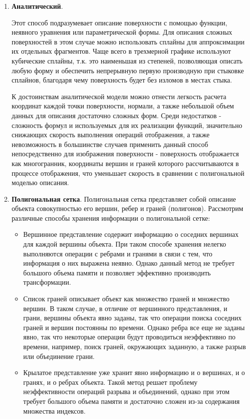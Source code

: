\begin{enumerate}
	\item \textbf{Аналитический}. 
	
	Этот способ подразумевает описание поверхности с помощью функции, неявного уравнения или параметрической формы. Для описания сложных поверхностей в этом случае можно использовать сплайны для аппроксимации их отдельных фрагментов. Чаще всего в трехмерной графике используют кубические сплайны, т.к. это наименьшая из степеней, позволяющая описать любую форму и обеспечить непрерывную первую производную при стыковке сплайнов, благодаря чему поверхность будет без изломов в местах стыка. 
	
	К достоинствам аналитической модели можно отнести легкость расчета координат каждой точки поверхности, нормали, а также небольшой объем данных для описания достаточно сложных форм. Среди недостатков - сложность формул и используемых для их реализации функций, значительно снижающих скорость выполнения операций отображения, а также невозможность в большинстве случаев применить данный способ непосредственно для изображения поверхности - поверхность отображается как многогранник, координаты вершин и граней которого рассчитываются в процессе отображения, что уменьшает скорость в сравнении с полигональной моделью описания.
	
	\item \textbf{Полигональная сетка}.
	Полигональная сетка представляет собой описание объекта совокупностью его вершин, ребер и граней (полигонов). Рассмотрим различные способы хранения информации о полигональной сетке:
	
	\begin{itemize}
		\item Вершинное представление содержит информацию о соседних вершинах для каждой вершины объекта. При таком способе хранения нелегко выполняются операции с ребрами и гранями в связи с тем, что информация о них выражена неявно. Однако данный метод не требует большого объема памяти и позволяет эффективно производить трансформации.
		\item Список граней описывает объект как множество граней и множество вершин. В таком случае, в отличие от вершинного представления, и грани, вершины объекта явно заданы, так что операции поиска соседних граней и вершин постоянны по времени. Однако ребра все еще не заданы явно, так что некоторые операции будут проводиться неэффективно по времени, например, поиск граней, окружающих заданную, а также разрыв или объединение грани.
		\item Крылатое представление уже хранит явно информацию и о вершинах, и о гранях, и о ребрах объекта. Такой метод решает проблему неэффективности операций разрыва и объединений, однако при этом требует большого объема памяти и достаточно сложен из-за содержания множества индексов.
	\end{itemize}	
\end{enumerate}

